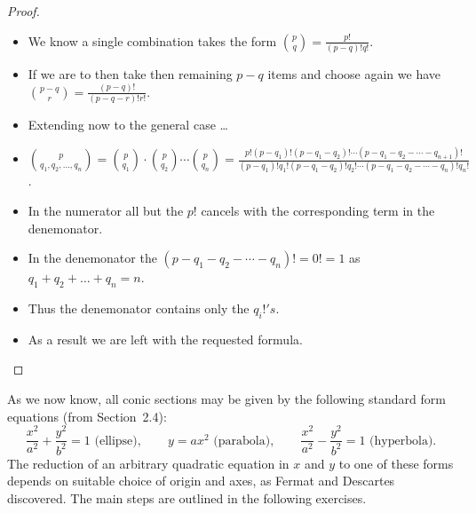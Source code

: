 \documentclass[12pt]{article}
\newcommand{\ds}{\displaystyle}
\theoremstyle{plain}
\begin{document}
\begin{proof}
  \ \\

  \begin{itemize}
    \item We know a single combination takes the form $ \ds \binom{p}{q} = \frac{p!}{(p - q)! q!} $.
    \item If we are to then take then remaining $ p - q $ items and choose again we have $ \ds \binom{p-q}{r} = \frac{(p - q)!}{(p - q - r)! r!} $.
    \item Extending now to the general case \dots
    \item[$\ast$] $ \ds \binom{p}{q_{1}, q_{2}, \dots, q_{n}} = \binom{p}{q_{1}} \cdot \binom{p}{q_{2}} \cdots \binom{p}{q_{n}} = \frac{p!(p - q_{1})! (p - q_{1} - q_{2})! \cdots (p - q_{1} - q_{2} - \cdots - q_{n + 1})!}{(p - q_{1})! q_{1}! (p - q_{1} - q_{2})! q_{2}! \cdots (p - q_{1} - q_{2} - \cdots - q_{n})! q_{n}!} $.
    \item[$\ast$] In the numerator all but the $ p! $ cancels with the corresponding term in the denemonator.
    \item[$\ast$] In the denemonator the $ (p - q_{1} - q_{2} - \cdots - q_{n})! = 0! = 1 $ as $ q_{1} + q_{2} + \dots + q_{n} = n $.
    \item[$\ast$] Thus the denemonator contains only the $ q_{i} !'s $.
    \item As a result we are left with the requested formula.
  \end{itemize}

\end{proof}

\newpage

As we now know, all conic sections may be given by the following standard form equations (from Section~2.4):
\[
  \frac{x^{2}}{a^{2}} + \frac{y^{2}}{b^{2}} = 1\text{ (ellipse)},\qquad y = ax^{2} \text{ (parabola)}, \qquad \frac{x^{2}}{a^{2}} - \frac{y^{2}}{b^{2}} = 1\text{ (hyperbola)}.
\]
The reduction of an arbitrary quadratic equation in $ x $ and $ y $ to one of these forms depends
on suitable choice of origin and axes, as Fermat and Descartes discovered.
The main steps are outlined in the following exercises.

\end{document}
